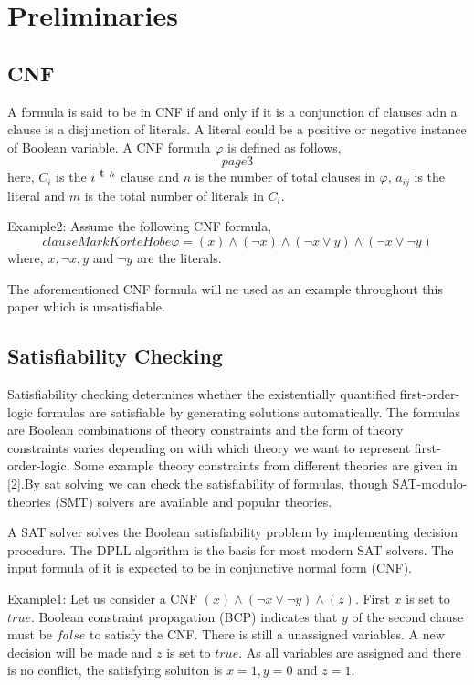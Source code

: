 \section{Preliminaries}
\label{sec:preliminaries}
\subsection{CNF}
A formula is said to be in CNF if and only if it is a conjunction of clauses adn a clause is a disjunction of literals. A literal could be a positive or negative instance of Boolean variable. A CNF formula $\varphi$ is defined as follows,
$$page 3$$
here, $C_{i}$ is the $i^{\text th}$ clause and $n$ is the number of total clauses in $\varphi$, $a_{ij}$ is the literal and $m$ is the total number of literals in $C_{i}$.

Example2: Assume the following CNF formula,
$$clauseMarkKorteHobe\varphi=(x)\wedge(\neg x)\wedge(\neg x\vee y)\wedge(\neg x \vee \neg y)$$
where, $x, \neg x, y$ and $\neg y$ are the literals.

The aforementioned CNF formula will ne used as an example throughout this paper which is unsatisfiable.
\subsection{Satisfiability Checking}
Satisfiability checking determines whether the existentially quantified first-order-logic formulas are satisfiable by generating solutions automatically. The formulas are Boolean combinations of theory constraints and the form of theory constraints varies depending on with which theory we want to represent first-order-logic. Some example theory constraints from different theories are given in [2].By sat solving we can check the satisfiability of formulas, though  SAT-modulo-theories (SMT) solvers are available and popular theories.

A SAT solver solves the Boolean satisfiability problem by implementing decision procedure. The DPLL algorithm is the basis for most modern SAT solvers. The input formula of it is expected to be in conjunctive normal form (CNF).

Example1: Let us consider a CNF $(x) \wedge (\neg x\vee\neg y) \wedge (z)$. First $x$ is set to $true$. Boolean constraint propagation
(BCP) indicates that  $y$ of the second clause must be $false$ to satisfy the CNF. There is still a unassigned variables. A new decision will be made and $z$ is set to $true$. As all variables are assigned and there is no conflict, the satisfying soluiton is $x=1, y=0$ and $z=1$.

